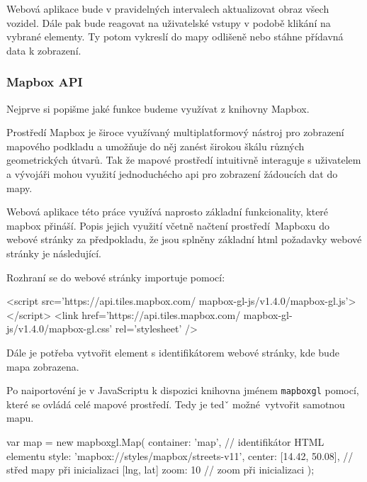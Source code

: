 \bigbreak

Webová aplikace bude v pravidelných intervalech aktualizovat obraz všech vozidel. Dále pak bude reagovat na uživatelské vstupy v podobě klikání na vybrané elementy. Ty potom vykreslí do mapy odlišeně nebo stáhne přídavná data k zobrazení.

\subsubsection{Mapbox API}

Nejprve si popišme jaké funkce budeme využívat z knihovny Mapbox.

\bigbreak

Prostředí Mapbox je široce využívaný multiplatformový nástroj pro zobrazení mapového podkladu a umožňuje do něj zanést širokou škálu různých geometrických útvarů. Tak že mapové prostředí intuitivně interaguje s uživatelem a vývojáři mohou využití jednoduchécho \gls{api} pro zobrazení žádoucích dat do mapy.

\bigbreak

Webová aplikace této práce využívá naprosto základní funkcionality, které mapbox přináší.  Popis jejich využití včetně načtení prostředí Mapboxu do webové stránky za předpokladu, že jsou splněny základní \gls{html} požadavky webové stránky je následující.

\bigbreak

Rozhraní se do webové stránky importuje pomocí:

\begin{code}[frame=none]
<script src='https://api.tiles.mapbox.com/
  mapbox-gl-js/v1.4.0/mapbox-gl.js'></script>
<link href='https://api.tiles.mapbox.com/
  mapbox-gl-js/v1.4.0/mapbox-gl.css' rel='stylesheet' />
\end{code}

\bigbreak

Dále je potřeba vytvořit element s identifikátorem webové stránky, kde bude mapa zobrazena.

\bigbreak

Po naiportovéní je v JavaScriptu k dispozici knihovna jménem \verb-mapboxgl- pomocí, které se ovládá celé mapové prostředí. Tedy je tedˇ možné vytvořit samotnou mapu.

\begin{code}[frame=none]
var map = new mapboxgl.Map({
  container: 'map', // identifikátor HTML elementu
  style: 'mapbox://styles/mapbox/streets-v11',
  center: [14.42, 50.08], // střed mapy při inicializaci [lng, lat]
    zoom: 10 // zoom při inicializaci
});
\end{code}

